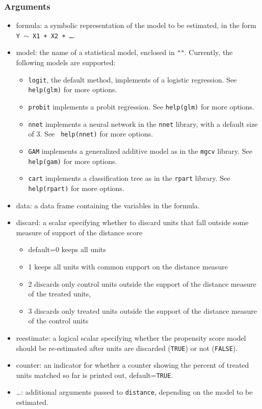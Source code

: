 \documentclass[oneside,letterpaper,titlepage]{article}
\begin{document}
\begin{appendix}
\subsubsection{Arguments}
\begin{itemize}
\item{formula}: a symbolic representation of the model to be
  estimated, in the form {\tt Y $\sim$ X1 + X2 + \dots}.
\item{model}: the name of a statistical model, enclosed in {\tt ""}.
  Currently, the following models are supported:
  \begin{itemize}
  \item \texttt{logit}, the default method, implements of a logistic
    regression.  See {\tt help(glm)} for more options.
  \item \texttt{probit} implements a probit regression.  See
    {\tt help(glm)} for more options. 
  \item \texttt{nnet} implements a neural network in the
    \texttt{nnet} library, with a default size of 3.  See {\tt
      help(nnet)} for more options.
  \item \texttt{GAM} implements a generalized additive model 
    as in the \texttt{mgcv} library.  See
    {\tt help(gam)} for more options.
  \item \texttt{cart} implements a classification tree as in the
    \texttt{rpart} library.  See {\tt help(rpart)} for more
    options.  
  \end{itemize}
\item{data}: a data frame containing the variables in the formula.
\item{discard}: a scalar specifying whether to discard units that fall
  outside some measure of support of the distance score
  \begin{itemize}
  \item default=0 keeps all units
  \item  1 keeps all units with common support on the distance
    measure
  \item 2 discards only control units outside the support of the
    distance measure of the treated units,
  \item 3 discards only treated units outside the support of the
    distance measure of the control units
  \end{itemize}
\item{reestimate}: a logical scalar specifying whether the propensity
  score model should be re-estimated after units are discarded
  (\texttt{TRUE}) or not (\texttt{FALSE}).
\item{counter}: an indicator for whether a counter showing the percent of treated units matched so far is printed out, default={\tt TRUE}.
\item{\dots}: additional arguments passed to \texttt{distance}, depending on
    the model to be estimated.
\end{itemize}


\end{appendix}
\end{document}
